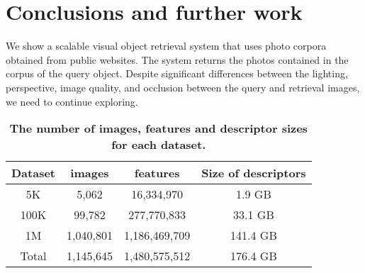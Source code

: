 \documentclass[a4paper,12pt]{article}
\begin{document}
\section{ Conclusions and further work}
	We show a scalable visual object retrieval system that uses photo corpora obtained from public websites.\cite{Barroso2003Web} The system returns the photos contained in the corpus of the query object. Despite significant differences between the lighting, perspective, image quality, and occlusion between the query and retrieval images, we need to continue exploring.	
		\begin{table}[h]%
		\centering 
		\caption{\bfseries{The number of images, features and descriptor sizes for each dataset.
		} }\label{table1}
	
		\begin{tabular}{|c|c|c|c|}
			\hline
			Dataset &  images&   features & Size of descriptors\\
			\hline
			5K   &  5,062 & 16,334,970 &1.9 GB \\
			\hline
			100K	 &  99,782& 277,770,833 &   33.1 GB \\
			\hline
			1M    & 1,040,801& 1,186,469,709& 141.4 GB\\
			\hline
			Total  &1,145,645&1,480,575,512 &176.4 GB\\
			\hline
		\end{tabular}
	\end{table}
 

%  
%
 
   
\end{document}
